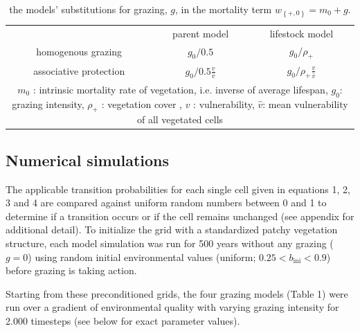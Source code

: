 \begin{table}[!th]
\label{tab:models}
\caption{the models' substitutions for grazing,  $g$, in the mortality term $w_{ \left\{ +,0 \right\} }  = m_0 + g$.  }
\centering
\begin{tabular}{ccc}

\toprule
 & parent model & lifestock model \\ \cmidrule(rl){2-2} \cmidrule(rl){3-3}
homogenous grazing &  $g_0/0.5$ & $g_0/\rho_+$\\
associative protection & $g_0/0.5 \frac{v}{\hat{v}}$  & $g_0/\rho_+ \frac{v}{\hat{v}}$ \\
	\bottomrule
\multicolumn{3}{p{9.5cm}}{\footnotesize $m_0$ : intrinsic mortality rate of vegetation, i.e. inverse of average lifespan, $g_0$: grazing intensity, $\rho_+$ : vegetation cover , $v$ : vulnerability, $\hat{v}$: mean vulnerability of all vegetated cells }
	\end{tabular}
\end{table}



\subsection{Numerical simulations}

The applicable transition probabilities for each single cell given in equations 1, 2, 3 and 4 are compared against uniform random numbers between 0 and 1 to determine if a transition occurs or if the cell remains unchanged (see appendix for additional detail). To initialize the grid with a standardized patchy vegetation structure, each model simulation was run for 500 years without any grazing ($g = 0$) using random initial environmental values (uniform; $ 0.25 <  b_\mathrm{ini} < 0.9 $) before grazing is taking action. %
 
Starting from these preconditioned grids, the four grazing models (Table 1) were run over a gradient of environmental quality with varying grazing intensity for 2.000 timesteps (see below for exact parameter values). 

